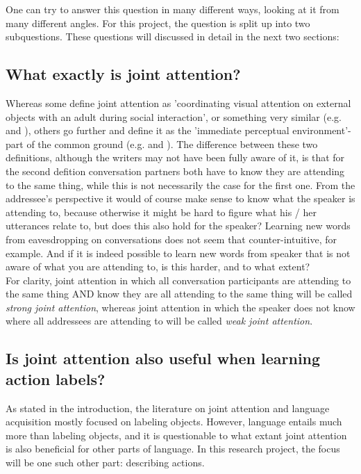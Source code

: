 \documentclass[12pt]{article}
\begin{document}
One can try to answer this question in many different ways, looking at it from many different angles. For this project, the question is split up into two subquestions. These questions will discussed in detail in the next two sections:

\subsection{What exactly is joint attention?}
Whereas some define joint attention as 'coordinating visual attention on external objects with an adult during social interaction', or something very similar (e.g. \citet{ddc93} and \citet{dd04}), others go further and define it as the 'immediate perceptual environment'-part of the common ground (e.g. \citet{c96} and \citet{t08}). The difference between these two definitions, although the writers may not have been fully aware of it, is that for the second defition conversation partners both have to know they are attending to the same thing, while this is not necessarily the case for the first one. From the addressee's perspective it would of course make sense to know what the speaker is attending to, because otherwise it might be hard to figure what his / her utterances relate to, but does this also hold for the speaker? Learning new words from eavesdropping on conversations does not seem that counter-intuitive, for example. And if it is indeed possible to learn new words from speaker that is not aware of what you are attending to, is this harder, and to what extent?\\\indent For clarity, joint attention in which all conversation participants are attending to the same thing AND know they are all attending to the same thing will be called \emph{strong joint attention}, whereas joint attention in which the speaker does not know where all addressees are attending to will be called \emph{weak joint attention}.

\subsection{Is joint attention also useful when learning action labels?}
As stated in the introduction, the literature on joint attention and language acquisition mostly focused on labeling objects. However, language entails much more than labeling objects, and it is questionable to what extant joint attention is also beneficial for other parts of language. In this research project, the focus will be one such other part: describing actions.
\end{document}
